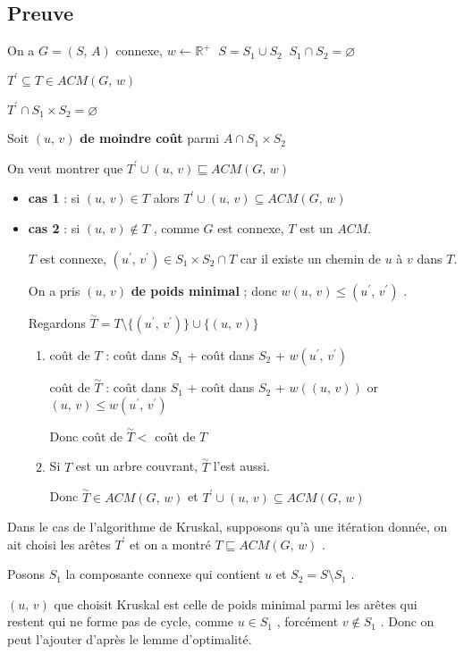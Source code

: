 \subsection*{Preuve}
On a $G = (S,\, A)$ connexe, $w \longleftarrow \mathbb{R}^{+}$ $\;S = S_{1} \cup S_{2} \;\; S_{1} \cap S_{2} = \varnothing$

$T^{\prime} \subseteq T\in ACM(G,\, w)$

$T^{\prime} \cap S_{1} \times S_{2} = \varnothing$

Soit $(u,\, v)$ \textbf{de moindre coût} parmi $A \cap S_{1} \times S_{2}$

On veut montrer que $T^{\prime} \cup (u,\, v) \sqsubseteq ACM(G,\, w)$

\begin{itemize}
\item \textbf{cas 1} : si $(u,\, v) \in T$ alors $T^{\prime} \cup (u,\, v) \subseteq ACM(G,\, w)$
\item \textbf{cas 2} : si $(u,\, v) \notin T$ , comme $G$ est connexe, $T$ est  un $ACM$.

$T$ est connexe, $(u^{\prime},\, v^{\prime}) \in S_{1} \times S_{2} \cap T$ car il existe un chemin de $u$ à $v$ dans $T$.

On a pris $(u,\, v)$ \textbf{de poids minimal} ; donc $w(u,\, v) \leq (u^{\prime},\, v^{\prime})$ .

Regardons $\overset{\sim}{T} = T \setminus \lbrace (u^{\prime},\, v^{\prime}) \rbrace \cup \lbrace (u,\, v) \rbrace$

\begin{enumerate}
\item coût de $T$ : coût dans $S_{1}$ + coût dans $S_{2}$ + $w(u^{\prime},\, v^{\prime})$

coût de $\overset{\sim}{T}$ : coût dans $S_{1}$ + coût dans $S_{2}$ + $w((u,\, v))$ or $(u,\, v) \leq w(u^{\prime},\, v^{\prime})$

Donc coût de $\overset{\sim}{T} < $ coût de $T$

\item Si $T$ est un arbre couvrant, $\overset{\sim}{T}$ l'est aussi.

Donc $\overset{\sim}{T} \in ACM(G,\, w)$ et $T^{\prime} \cup (u,\, v) \subseteq ACM(G,\, w)$
\end{enumerate}
\end{itemize}

Dans le cas de l'algorithme de Kruskal, supposons qu'à une itération donnée, on ait choisi les arêtes $T^{\prime}$ et on a montré $T \sqsubseteq ACM(G,\, w)$ .

Posons $S_{1}$ la composante connexe qui contient $u$ et $S_{2} = S \setminus S_{1}$ .

$(u,\, v)$ que choisit Kruskal est celle de poids minimal parmi les arêtes qui restent qui ne forme pas de cycle, comme $u \in S_{1}$ , forcément $v \notin S_{1}$ . Donc on peut l'ajouter d'après le lemme d'optimalité.

